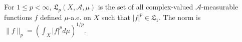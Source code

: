 For $1 \leq p < \infty$, $\mathfrak{L}_p(X, \mathcal{A}, \mu)$ is the set of all complex-valued $\mathcal{A}$-measurable functions $f$ defined $\mu$-a.e. on $X$ such that $|f|^p \in \mathfrak{L}_1$. The norm is $\|f\|_p = (\int_X |f|^p d\mu)^{1/p}$.
